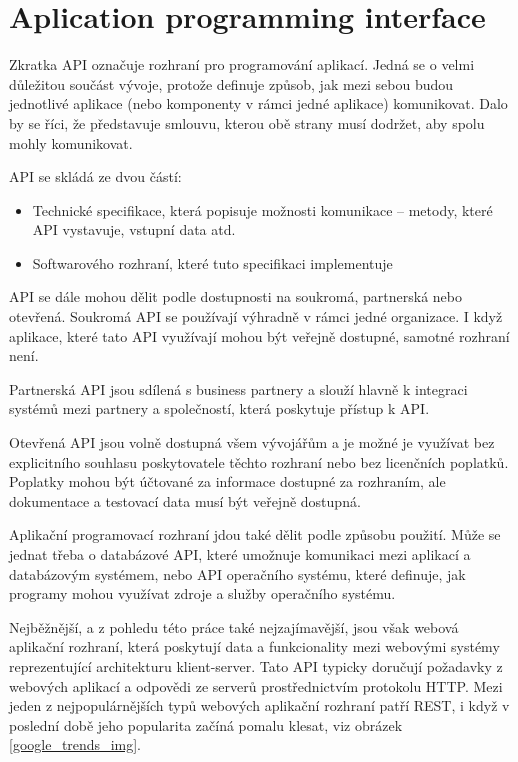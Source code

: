 \documentclass[thesis=M,czech]{FITthesis}[2019/12/23]
\begin{document}
\section{Aplication programming interface}
Zkratka API označuje rozhraní pro programování aplikací. Jedná se o velmi důležitou součást vývoje, protože definuje způsob, jak mezi sebou budou jednotlivé aplikace (nebo komponenty v rámci jedné aplikace) komunikovat. Dalo by se říci, že představuje smlouvu, kterou obě strany musí dodržet, aby spolu mohly komunikovat.

API se skládá ze dvou částí: 
\begin{itemize}
    \item Technické specifikace, která popisuje možnosti komunikace -- metody, které API vystavuje, vstupní data atd.
    \item Softwarového rozhraní, které tuto specifikaci implementuje
\end{itemize}

API se dále mohou dělit podle dostupnosti na soukromá, partnerská nebo otevřená. Soukromá API se používají výhradně v rámci jedné organizace. I když aplikace, které tato API využívají mohou být veřejně dostupné, samotné rozhraní není.

Partnerská API jsou sdílená s business partnery a slouží hlavně k integraci systémů mezi partnery a společností, která poskytuje přístup k API.

Otevřená API jsou volně dostupná všem vývojářům a je možné je využívat bez explicitního souhlasu poskytovatele těchto rozhraní nebo bez licenčních poplatků. Poplatky mohou být účtované za informace dostupné za rozhraním, ale dokumentace a testovací data musí být veřejně dostupná.

Aplikační programovací rozhraní jdou také dělit podle způsobu použití. Může se jednat třeba o databázové API, které umožnuje komunikaci mezi aplikací a databázovým systémem, nebo API operačního systému, které definuje, jak programy mohou využívat zdroje a služby operačního systému.

Nejběžnější, a z pohledu této práce také nejzajímavější, jsou však webová aplikační rozhraní, která poskytují data a funkcionality mezi webovými systémy reprezentující architekturu klient-server. Tato API typicky doručují požadavky z webových aplikací a odpovědi ze serverů prostřednictvím protokolu HTTP. Mezi jeden z nejpopulárnějších typů webových aplikační rozhraní patří REST, i když v poslední době jeho popularita začíná pomalu klesat, viz obrázek \ref{google_trends_img}.
\end{document}
